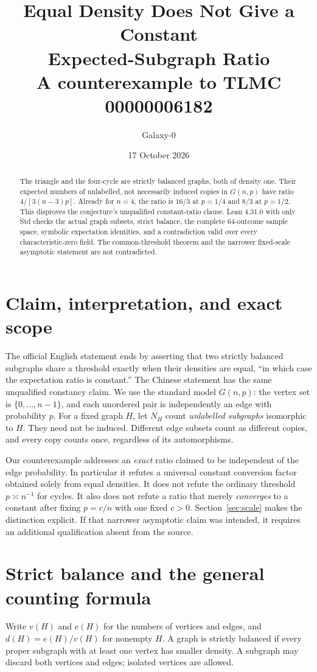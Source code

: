 \documentclass[11pt]{article}
\title{Equal Density Does Not Give a Constant\\Expected-Subgraph Ratio\\[3pt]\large A counterexample to TLMC 00000006182}
\author{Galaxy-0}
\date{17 October 2026}
\begin{document}
\maketitle
\begin{abstract}
The triangle and the four-cycle are strictly balanced graphs, both of density
one. Their expected numbers of unlabelled, not necessarily induced copies in
$G(n,p)$ have ratio $4/[3(n-3)p]$. Already for $n=4$, the ratio is $16/3$ at
$p=1/4$ and $8/3$ at $p=1/2$. This disproves the conjecture's unqualified
constant-ratio clause. Lean 4.31.0 with only Std checks the actual graph
subsets, strict balance, the complete 64-outcome sample space, symbolic
expectation identities, and a contradiction valid over every
characteristic-zero field. The common-threshold theorem and the narrower
fixed-scale asymptotic statement are not contradicted.
\end{abstract}

\section{Claim, interpretation, and exact scope}
The official English statement ends by asserting that two strictly balanced
subgraphs share a threshold exactly when their densities are equal, ``in
which case the expectation ratio is constant.'' The Chinese statement has
the same unqualified constancy claim. We use the standard model $G(n,p)$:
the vertex set is $\{0,\ldots,n-1\}$, and each unordered pair is independently
an edge with probability $p$. For a fixed graph $H$, let $N_H$ count
\emph{unlabelled subgraphs} isomorphic to $H$. They need not be induced.
Different edge subsets count as different copies, and every copy counts
once, regardless of its automorphisms.

Our counterexample addresses an \emph{exact} ratio claimed to be independent
of the edge probability. In particular it refutes a universal constant
conversion factor obtained solely from equal densities. It does not refute
the ordinary threshold $p\asymp n^{-1}$ for cycles. It also does not refute a
ratio that merely \emph{converges} to a constant after fixing
$p=c/n$ with one fixed $c>0$. Section~\ref{sec:scale} makes the distinction
explicit. If that narrower asymptotic claim was intended, it requires an
additional qualification absent from the source.

\section{Strict balance and the general counting formula}
Write $v(H)$ and $e(H)$ for the numbers of vertices and edges, and
$d(H)=e(H)/v(H)$ for nonempty $H$. A graph is strictly balanced if every
proper subgraph with at least one vertex has smaller density. A subgraph
may discard both vertices and edges; isolated vertices are allowed.
\end{document}
